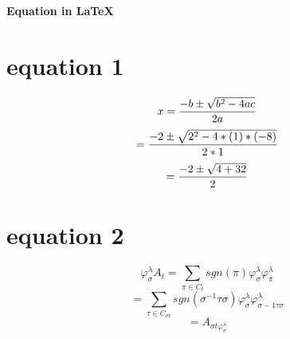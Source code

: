 \documentclass[a4paper,12pt]{article}
\begin{document}
\begin{center}
\LARGE \textbf{Equation in \LaTeX}
\end{center}
\section*{equation 1}
\begin{fleqn}
\[
x = \frac{-b \pm \sqrt{b^2-4ac}} {2a} \\
\]
\[
   = \frac{-2 \pm \sqrt{2^2-4*(1)*(-8)}}{2*1} \\
  \]
  \[
  = \frac{-2 \pm \sqrt{4+32}}{2} \\
  \]
  \end{fleqn}
  \section*{equation 2}
  \begin{fleqn}
  \[
  \varphi^\lambda_\sigma A_t = \sum_{\pi \in C_t} sgn(\pi) \varphi^{\lambda}_{\sigma} \varphi^\lambda_\pi
  \]
  \[
  = \sum_{\tau \in C_{\sigma t}} sgn{(\sigma^{-1} \tau \sigma)} \varphi^{\lambda}_{\sigma} \varphi^{\lambda}_{\sigma-1 \tau \sigma}
\]
\[
= A_{\sigma t \varphi^{\lambda}_{\sigma}}
\]
  \end{fleqn}
\end{document}
